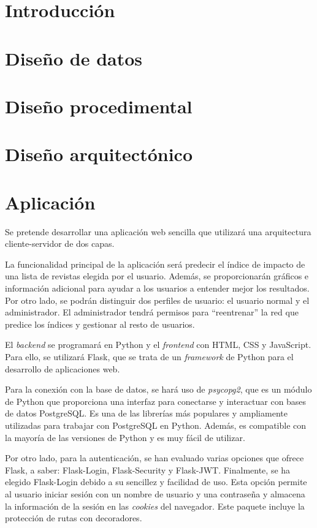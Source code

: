 
\section{Introducción}

\section{Diseño de datos}

\section{Diseño procedimental}

\section{Diseño arquitectónico}

\section{Aplicación}

Se pretende desarrollar una aplicación web sencilla que utilizará una arquitectura cliente-servidor de dos capas.

La funcionalidad principal de la aplicación será predecir el índice de impacto de una lista de revistas elegida por el usuario. Además, se proporcionarán gráficos e información adicional para ayudar a los usuarios a entender mejor los resultados. Por otro lado, se podrán distinguir dos perfiles de usuario: el usuario normal y el administrador. El administrador tendrá permisos para ``reentrenar'' la red que predice los índices y gestionar al resto de usuarios.

El \textit{backend} se programará en Python y el \textit{frontend} con HTML, CSS y JavaScript. Para ello, se utilizará Flask, que se trata de un \textit{framework} de Python para el desarrollo de aplicaciones web.

Para la conexión con la base de datos, se hará uso de \textit{psycopg2}, que es un módulo de Python que proporciona una interfaz para conectarse y interactuar con bases de datos PostgreSQL. 
Es una de las librerías más populares y ampliamente utilizadas para trabajar con PostgreSQL en Python. Además, es compatible con la mayoría de las versiones de Python y es muy fácil de utilizar.

Por otro lado, para la autenticación, se han evaluado varias opciones que ofrece Flask, a saber: Flask-Login, Flask-Security y Flask-JWT. 
Finalmente, se ha elegido Flask-Login debido a su sencillez y facilidad de uso. Esta opción permite al usuario iniciar sesión con un nombre de usuario y una contraseña y almacena la información de la sesión en las \textit{cookies} del navegador. Este paquete incluye la protección de rutas con decoradores.


